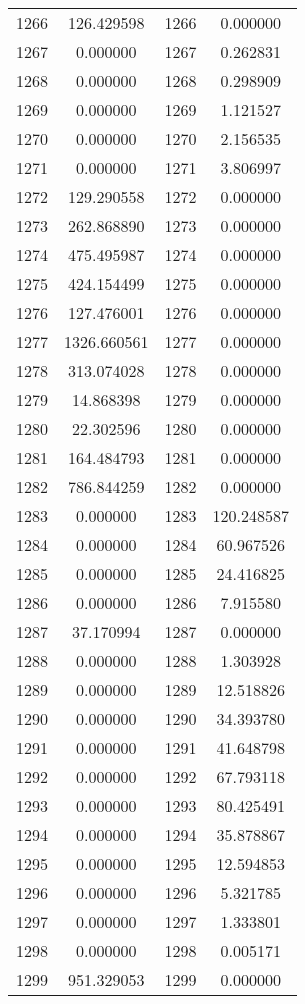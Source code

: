 \documentclass[12pt]{article}
\begin{document}
\begin{longtable}{@{}cccc@{}}
1266 & 126.429598 & 1266 & 0.000000 \\
1267 & 0.000000 & 1267 & 0.262831 \\
1268 & 0.000000 & 1268 & 0.298909 \\
1269 & 0.000000 & 1269 & 1.121527 \\
1270 & 0.000000 & 1270 & 2.156535 \\
1271 & 0.000000 & 1271 & 3.806997 \\
1272 & 129.290558 & 1272 & 0.000000 \\
1273 & 262.868890 & 1273 & 0.000000 \\
1274 & 475.495987 & 1274 & 0.000000 \\
1275 & 424.154499 & 1275 & 0.000000 \\
1276 & 127.476001 & 1276 & 0.000000 \\
1277 & 1326.660561 & 1277 & 0.000000 \\
1278 & 313.074028 & 1278 & 0.000000 \\
1279 & 14.868398 & 1279 & 0.000000 \\
1280 & 22.302596 & 1280 & 0.000000 \\
1281 & 164.484793 & 1281 & 0.000000 \\
1282 & 786.844259 & 1282 & 0.000000 \\
1283 & 0.000000 & 1283 & 120.248587 \\
1284 & 0.000000 & 1284 & 60.967526 \\
1285 & 0.000000 & 1285 & 24.416825 \\
1286 & 0.000000 & 1286 & 7.915580 \\
1287 & 37.170994 & 1287 & 0.000000 \\
1288 & 0.000000 & 1288 & 1.303928 \\
1289 & 0.000000 & 1289 & 12.518826 \\
1290 & 0.000000 & 1290 & 34.393780 \\
1291 & 0.000000 & 1291 & 41.648798 \\
1292 & 0.000000 & 1292 & 67.793118 \\
1293 & 0.000000 & 1293 & 80.425491 \\
1294 & 0.000000 & 1294 & 35.878867 \\
1295 & 0.000000 & 1295 & 12.594853 \\
1296 & 0.000000 & 1296 & 5.321785 \\
1297 & 0.000000 & 1297 & 1.333801 \\
1298 & 0.000000 & 1298 & 0.005171 \\
1299 & 951.329053 & 1299 & 0.000000 \\

\end{longtable}
\end{document}
